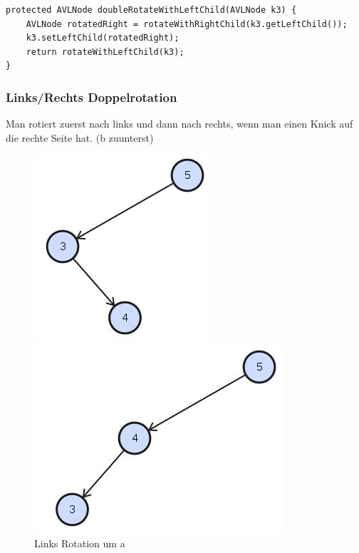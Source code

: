 \begin{lstlisting}[caption=AVL Tree: Right/Left Rotation]
protected AVLNode doubleRotateWithLeftChild(AVLNode k3) {
	AVLNode rotatedRight = rotateWithRightChild(k3.getLeftChild());
	k3.setLeftChild(rotatedRight);
	return rotateWithLeftChild(k3);
}
\end{lstlisting}

\clearpage

\subsubsection{Links/Rechts Doppelrotation}
Man rotiert zuerst nach links und dann nach rechts, wenn man einen Knick auf die rechte Seite hat. (b zuunterst)
\begin{figure}[h!]
	\centering
	\begin{minipage}[t]{0.4\textwidth}
		\centering
		\includegraphics[width=0.7\linewidth]{images/avl_leftright_rotation_1.jpg}
		\caption{Links Rotation um a}
		\label{fig:trieexample}
	\end{minipage}
	\begin{minipage}[t]{0.4\textwidth}
		\centering
		\includegraphics[width=0.9\linewidth]{images/avl_right_rotation_1}

\end{minipage}
\end{figure}
